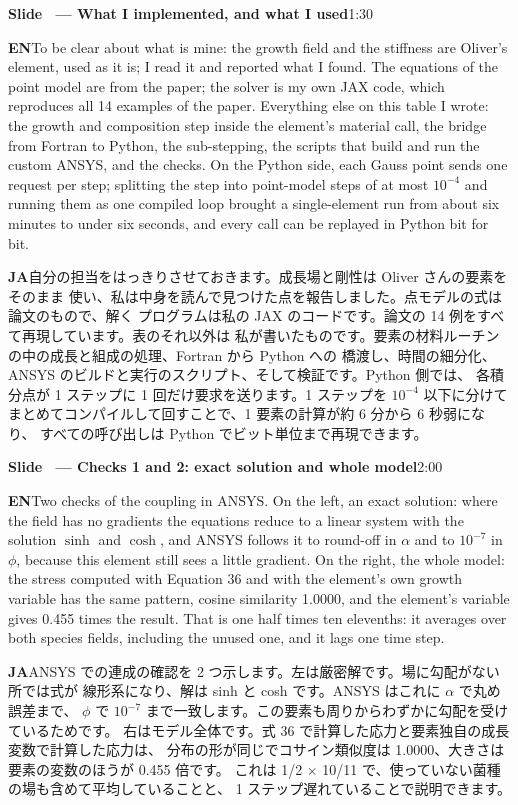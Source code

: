 \documentclass[11pt,a4paper]{article}
\newcounter{sl}
\newcommand{\slide}[2]{\stepcounter{sl}\vspace{8pt}%
  {\color{c3}\large\bfseries Slide \thesl\ --- #1}\hfill{\small #2}\par\vspace{2pt}}
\newcommand{\EN}{\textbf{EN}\quad}
\newcommand{\JA}{\par\textbf{JA}\quad}
\begin{document}
\slide{What I implemented, and what I used}{1:30}
\EN To be clear about what is mine: the growth field and the stiffness are
Oliver's element, used as it is; I read it and reported what I found. The
equations of the point model are from the paper; the solver is my own JAX
code, which reproduces all 14 examples of the paper. Everything else on this
table I wrote: the growth and composition step inside the element's material
call, the bridge from Fortran to Python, the sub-stepping, the scripts that
build and run the custom ANSYS, and the checks. On the Python side, each
Gauss point sends one request per step; splitting the step into point-model
steps of at most $10^{-4}$ and running them as one compiled loop brought a
single-element run from about six minutes to under six seconds, and every
call can be replayed in Python bit for bit.
\JA 自分の担当をはっきりさせておきます。成長場と剛性は Oliver さんの要素をそのまま
使い、私は中身を読んで見つけた点を報告しました。点モデルの式は論文のもので、解く
プログラムは私の JAX のコードです。論文の 14 例をすべて再現しています。表のそれ以外は
私が書いたものです。要素の材料ルーチンの中の成長と組成の処理、Fortran から Python への
橋渡し、時間の細分化、ANSYS のビルドと実行のスクリプト、そして検証です。Python 側では、
各積分点が 1 ステップに 1 回だけ要求を送ります。1 ステップを $10^{-4}$ 以下に分けて
まとめてコンパイルして回すことで、1 要素の計算が約 6 分から 6 秒弱になり、
すべての呼び出しは Python でビット単位まで再現できます。

\slide{Checks 1 and 2: exact solution and whole model}{2:00}
\EN Two checks of the coupling in ANSYS. On the left, an exact solution: where
the field has no gradients the equations reduce to a linear system with the
solution $\sinh$ and $\cosh$, and ANSYS follows it to round-off in $\alpha$
and to $10^{-7}$ in $\phi$, because this element still sees a little gradient.
On the right, the whole model: the stress computed with Equation 36 and with
the element's own growth variable has the same pattern, cosine similarity
1.0000, and the element's variable gives 0.455 times the result. That is one
half times ten elevenths: it averages over both species fields, including the
unused one, and it lags one time step.
\JA ANSYS での連成の確認を 2 つ示します。左は厳密解です。場に勾配がない所では式が
線形系になり、解は sinh と cosh です。ANSYS はこれに $\alpha$ で丸め誤差まで、
$\phi$ で $10^{-7}$ まで一致します。この要素も周りからわずかに勾配を受けているためです。
右はモデル全体です。式 36 で計算した応力と要素独自の成長変数で計算した応力は、
分布の形が同じでコサイン類似度は 1.0000、大きさは要素の変数のほうが 0.455 倍です。
これは 1/2 × 10/11 で、使っていない菌種の場も含めて平均していることと、
1 ステップ遅れていることで説明できます。
\end{document}
